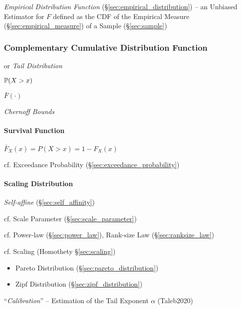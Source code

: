 \fist \emph{Empirical Distribution Function}
(\S\ref{sec:empirical_distribution}) -- an Unbiased Estimator for $F$ defined as
the CDF of the Empirical Measure (\S\ref{sec:empirical_measure}) of a Sample
(\S\ref{sec:sample})



\subsubsection{Complementary Cumulative Distribution Function}
\label{sec:tail_distribution}

or \emph{Tail Distribution}

$\mathbb{P}(X > x)$

$\bar{F}(\cdot)$

\emph{Chernoff Bounds}



\paragraph{Survival Function}\label{sec:survival_function}\hfill

$\bar{F}_X(x) = P(X > x) = 1 - F_X(x)$

cf. Exceedance Probability (\S\ref{sec:exceedance_probability})



\paragraph{Scaling Distribution}\label{sec:scaling_distribution}\hfill

\emph{Self-affine} (\S\ref{sec:self_affinity})

cf. Scale Parameter (\S\ref{sec:scale_parameter})

cf. Power-law (\S\ref{sec:power_law}), Rank-size Law (\S\ref{sec:ranksize_law})

cf. Scaling (Homothety \S\ref{sec:scaling})


\begin{itemize}
  \item Pareto Distribution (\S\ref{sec:pareto_distribution})
  \item Zipf Distribution (\S\ref{sec:zipf_distribution})
\end{itemize}

``\emph{Calibration}'' -- Estimation of the Tail Exponent $\alpha$ (Taleb2020)

